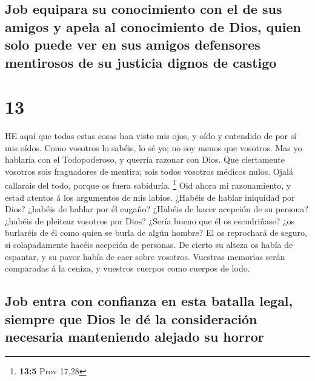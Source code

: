 \hypertarget{job-equipara-su-conocimiento-con-el-de-sus-amigos-y-apela-al-conocimiento-de-dios-quien-solo-puede-ver-en-sus-amigos-defensores-mentirosos-de-su-justicia-dignos-de-castigo}{%
\subsection{Job equipara su conocimiento con el de sus amigos y apela al
conocimiento de Dios, quien solo puede ver en sus amigos defensores
mentirosos de su justicia dignos de
castigo}\label{job-equipara-su-conocimiento-con-el-de-sus-amigos-y-apela-al-conocimiento-de-dios-quien-solo-puede-ver-en-sus-amigos-defensores-mentirosos-de-su-justicia-dignos-de-castigo}}

\hypertarget{section-12}{%
\section{13}\label{section-12}}

 HE aquí que todas estas cosas han visto mis ojos, y oído
y entendido de por sí mis oídos.  Como vosotros lo sabéis,
lo sé yo; no soy menos que vosotros.  Mas yo hablaría con
el Todopoderoso, y querría razonar con Dios.  Que
ciertamente vosotros sois fraguadores de mentira; sois todos vosotros
médicos nulos.  Ojalá callarais del todo, porque os fuera
sabiduría. \footnote{\textbf{13:5} Prov 17,28}  Oid ahora
mi razonamiento, y estad atentos á los argumentos de mis labios.
 ¿Habéis de hablar iniquidad por Dios? ¿habéis de hablar
por él engaño?  ¿Habéis de hacer acepción de su persona?
¿habéis de pleitear vosotros por Dios?  ¿Sería bueno que
él os escudriñase? ¿os burlaréis de él como quien se burla de algún
hombre?  El os reprochará de seguro, si solapadamente
hacéis acepción de personas.  De cierto su alteza os
había de espantar, y su pavor había de caer sobre vosotros.
 Vuestras memorias serán comparadas á la ceniza, y
vuestros cuerpos como cuerpos de lodo.

\hypertarget{job-entra-con-confianza-en-esta-batalla-legal-siempre-que-dios-le-duxe9-la-consideraciuxf3n-necesaria-manteniendo-alejado-su-horror}{%
\subsection{Job entra con confianza en esta batalla legal, siempre que
Dios le dé la consideración necesaria manteniendo alejado su
horror}\label{job-entra-con-confianza-en-esta-batalla-legal-siempre-que-dios-le-duxe9-la-consideraciuxf3n-necesaria-manteniendo-alejado-su-horror}}

